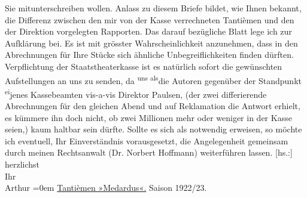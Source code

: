 \begin{ledgroupsized}[t]{13cm}
               Sie mitunterschreiben wollen. Anlass zu diesem Briefe bildet, wie Ihnen bekannt, die
               Differenz zwischen den mir von der Kasse verrechneten Tantièmen und den der Direktion
               vorgelegten Rapporten. Das darauf bezügliche Blatt lege ich zur Aufklärung bei.\pend
           \pstart
           Es ist mit grösster Wahrscheinlichkeit anzunehmen, dass in den Abrechnungen für Ihre
               Stücke sich ähnliche Unbegreiflichkeiten finden dürften.\pend
           \pstart
           Verpflichtung der Staatstheaterkasse ist es
               natürlich sofort die gewünschten Aufstellungen an uns zu senden, da \substVorne{}\textsuperscript{uns als}{\allowbreak}\substDazwischen{}die\substHinten{} Autoren gegenüber der Standpunkt \substVorne{}\textsuperscript{ei}\substDazwischen{}je\substHinten{}nes Kassebeamten vis-a-vis Direktor Paulsen, \introOben{}(\introOben{}der zwei differierende Abrechnungen für
               den gleichen Abend und auf Reklamation die Antwort erhielt, es kümmere ihn doch
               nicht, ob zwei Millionen mehr oder weniger in der Kasse seien,\introOben{})\introOben{} kaum haltbar sein dürfte.\pend
           \pstart
           Sollte es sich als notwendig erweisen, so möchte ich eventuell, Ihr Einverständnis
               vorausgesetzt, die Angelegenheit gemeinsam durch meinen Rechtsanwalt (Dr. Norbert Hoffmann) weiterführen lassen.\pend
           \pstart
           {[}hs.:{]} herzlichst{\\[\baselineskip]}Ihr{\\[\baselineskip]}\spacefill\mbox{Arthur}\pend
           \leftskip=0em{}\pstart
           \noindent{}\centering{}{\pb}\uline{Tantièmen »Medardus«.}\pend
           \pstart
           \noindent{}\centering{}Saison 1922/23.\pend
           \settowidth{\longeste}{Kassenrapporte:}\settowidth{\longestz}{Organ. Vorstl.}\settowidth{\longestd}{Mir verrechnet:}\settowidth{\longestv}{38,411.890}\settowidth{\longestf}{}\addtolength\longeste{1em}

\end{ledgroupsized}
